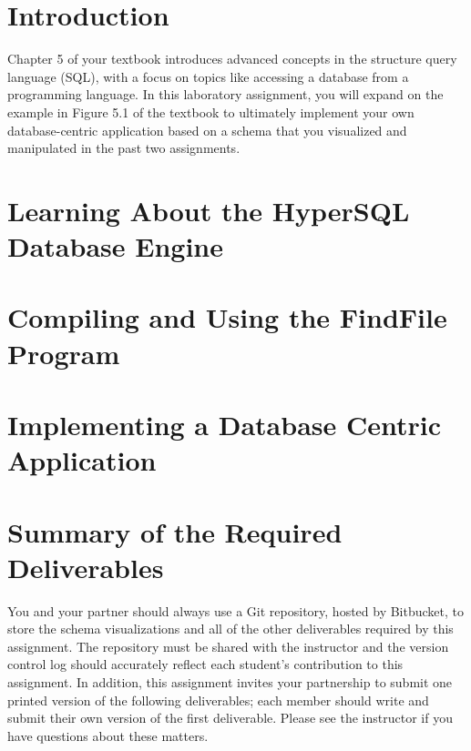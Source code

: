 


\usepackage[compact]{titlesec}



\section*{Introduction}

Chapter 5 of your textbook introduces advanced concepts in the structure query language (SQL), with a focus on topics
like accessing a database from a programming language. In this laboratory assignment, you will expand on the example in
Figure 5.1 of the textbook to ultimately implement your own database-centric application based on a schema that you
visualized and manipulated in the past two assignments.

\vspace*{-.05in}
\section*{Learning About the HyperSQL Database Engine}


\vspace*{-.05in}
\section*{Compiling and Using the FindFile Program}



\vspace*{-.05in}
\section*{Implementing a Database Centric Application}



\section*{Summary of the Required Deliverables}

You and your partner should always use a Git repository, hosted by Bitbucket, to store the schema visualizations and
all of the other deliverables required by this assignment. The repository must be shared with the instructor and
the version control log should accurately reflect each student's contribution to this assignment. In addition, this
assignment invites your partnership to submit one printed version of the following deliverables; each member should
write and submit their own version of the first deliverable. Please see the instructor if you have questions about
these matters.

